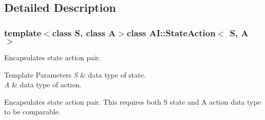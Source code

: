 \subsection{Detailed Description}
\subsubsection*{template$<$class S, class A$>$class A\+I\+::\+State\+Action$<$ S, A $>$}

Encapsulates state action pair. 


\begin{DoxyTemplParams}{Template Parameters}
{\em S} & data type of state. \\
\hline
{\em A} & data type of action.\\
\hline
\end{DoxyTemplParams}
Encapsulates state action pair. This requires both S state and A action data type to be comparable. 

